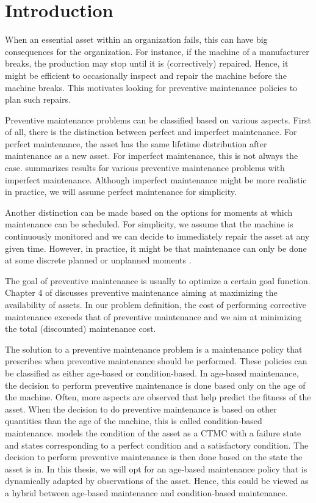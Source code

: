 \chapter{Introduction}\label{chapter:Introduction}
When an essential asset within an organization fails, this can have big consequences for the organization.
For instance, if the machine of a manufacturer breaks, the production may stop until it is (correctively) repaired.
Hence, it might be efficient to occasionally inspect and repair the machine before the machine breaks.
This motivates looking for preventive maintenance policies to plan such repairs.

Preventive maintenance problems can be classified based on various aspects.
First of all, there is the distinction between perfect and imperfect maintenance.
For perfect maintenance, the asset has the same lifetime distribution after maintenance as a new asset.
For imperfect maintenance, this is not always the case.
\cite{Pham1996} summarizes results for various preventive maintenance problems with imperfect maintenance.
Although imperfect maintenance might be more realistic in practice, we will assume perfect maintenance for simplicity.

Another distinction can be made based on the options for moments at which maintenance can be scheduled.
For simplicity, we assume that the machine is continuously monitored and we can decide to immediately repair the asset at any given time.
However, in practice, it might be that maintenance can only be done at some discrete planned or unplanned moments \cite{Kalosi2016}.

The goal of preventive maintenance is usually to optimize a certain goal function.
Chapter 4 of \cite{Zacks2012} discusses preventive maintenance aiming at maximizing the availability of assets.
In our problem definition, the cost of performing corrective maintenance exceeds that of preventive maintenance and we aim at minimizing the total (discounted) maintenance cost.

The solution to a preventive maintenance problem is a maintenance policy that prescribes when preventive maintenance should be performed.
These policies can be classified as either age-based or condition-based.
In age-based maintenance, the decision to perform preventive maintenance is done based only on the age of the machine.
Often, more aspects are observed that help predict the fitness of the asset.
When the decision to do preventive maintenance is based on other quantities than the age of the machine, this is called condition-based maintenance.
\cite{Kalosi2016} models the condition of the asset as a CTMC with a failure state and states corresponding to a perfect condition and a satisfactory condition.
The decision to perform preventive maintenance is then done based on the state the asset is in.
In this thesis, we will opt for an age-based maintenance policy that is dynamically adapted by observations of the asset.
Hence, this could be viewed as a hybrid between age-based maintenance and condition-based maintenance.

